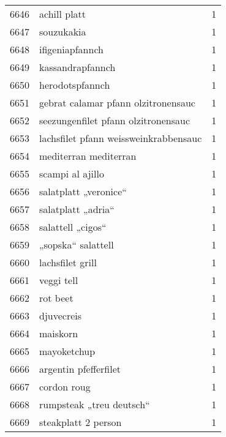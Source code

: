 \begin{tabular}{llr}
6646 &                                       achill platt &      1 \\
6647 &                                         souzukakia &      1 \\
6648 &                                    ifigeniapfannch &      1 \\
6649 &                                   kassandrapfannch &      1 \\
6650 &                                    herodotspfannch &      1 \\
6651 &                gebrat calamar pfann olzitronensauc &      1 \\
6652 &                seezungenfilet pfann olzitronensauc &      1 \\
6653 &              lachsfilet pfann weissweinkrabbensauc &      1 \\
6654 &                              mediterran mediterran &      1 \\
6655 &                                   scampi al ajillo &      1 \\
6656 &                              salatplatt „veronice“ &      1 \\
6657 &                                 salatplatt „adria“ &      1 \\
6658 &                                  salattell „cigos“ &      1 \\
6659 &                                 „sopska“ salattell &      1 \\
6660 &                                   lachsfilet grill &      1 \\
6661 &                                         veggi tell &      1 \\
6662 &                                           rot beet &      1 \\
6663 &                                         djuvecreis &      1 \\
6664 &                                           maiskorn &      1 \\
6665 &                                        mayoketchup &      1 \\
6666 &                              argentin pfefferfilet &      1 \\
6667 &                                        cordon roug &      1 \\
6668 &                           rumpsteak „treu deutsch“ &      1 \\
6669 &                                steakplatt 2 person &      1 \\

\end{tabular}
